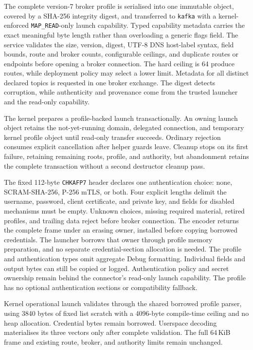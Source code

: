 The complete version-7 broker profile is serialised into one immutable object,
covered by a SHA-256 integrity digest, and transferred to \texttt{kafka} with a
kernel-enforced \texttt{MAP\_READ}-only launch capability. Typed capability
metadata carries the exact meaningful byte length rather than overloading a
generic flags field. The service validates the size, version, digest, UTF-8 DNS
host-label syntax, field bounds, route and broker counts, configurable ceilings,
and duplicate routes or endpoints before opening a broker connection. The hard
ceiling is 64 produce routes, while deployment policy may select a lower limit.
Metadata for all distinct declared topics is requested in one broker exchange.
The digest detects corruption, while authenticity and provenance come from the
trusted launcher and the read-only capability.

The kernel prepares a profile-backed launch transactionally. An owning launch
object retains the not-yet-running domain, delegated connection, and temporary
kernel profile object until read-only transfer succeeds. Ordinary rejection
consumes explicit cancellation after helper guards leave. Cleanup stops on its
first failure, retaining remaining roots, profile, and authority, but abandonment
retains the complete transaction without a second destructor cleanup pass.

The fixed 112-byte \texttt{CHKAFP7} header declares one authentication choice:
none, SCRAM-SHA-256, P-256 mTLS, or both. Four explicit
lengths delimit the username, password, client certificate, and private key, and
fields for disabled mechanisms must be empty. Unknown choices, missing required
material, retired profiles, and trailing data reject before broker connection.
The encoder returns the complete frame under an erasing owner, installed before
copying borrowed credentials. The launcher borrows that owner through profile
memory preparation, and no separate credential-section allocation is needed. The
profile and authentication types omit aggregate Debug formatting. Individual
fields and output bytes can still be copied or logged. Authentication policy
and secret ownership remain behind the connector's read-only launch capability.
The profile has no optional authentication sections or compatibility fallback.

Kernel operational launch validates through the shared borrowed profile parser,
using 3840 bytes of fixed list scratch with a 4096-byte compile-time ceiling
and no heap allocation. Credential bytes remain borrowed. Userspace decoding
materialises its three vectors only after complete validation. The full 64\,KiB
frame and existing route, broker, and authority limits remain unchanged.

